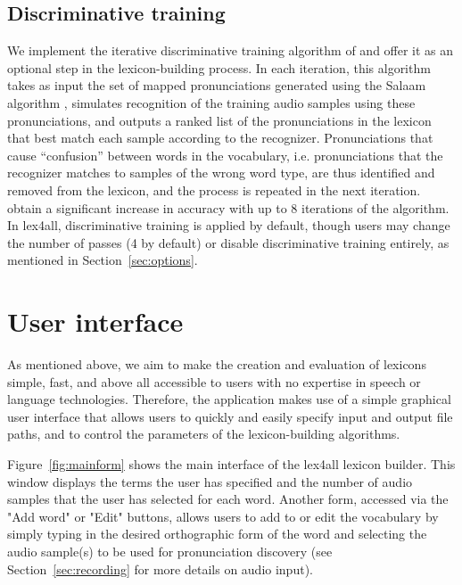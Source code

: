 \documentclass[11pt]{article}
\begin{document}
\subsection{Discriminative training}
\label{sec:discrimtrain}
We implement the iterative discriminative training algorithm of  and offer it as an optional step in the lexicon-building process. 
In each iteration, this algorithm takes as input the set of mapped pronunciations generated using the Salaam algorithm \cite{Qiao10}, simulates recognition of the training audio samples using these pronunciations, and outputs a ranked list of the pronunciations in the lexicon that best match each sample according to the recognizer. 
Pronunciations that cause ``confusion'' between words in the vocabulary, i.e. pronunciations that the recognizer matches to samples of the wrong word type, are thus identified and removed from the lexicon, and the process is repeated in the next iteration. 
 obtain a significant increase in accuracy with up to 8 iterations of the algorithm. 
In lex4all, discriminative training is applied by default, though users may change the number of passes (4 by default) or disable discriminative training entirely, as mentioned in Section~\ref{sec:options}.





\section{User interface}
\label{sec:frontend}

As mentioned above, we aim to make the creation and evaluation of lexicons simple, fast, and above all accessible to users with no expertise in speech or language technologies. Therefore, the application makes use of a simple graphical user interface that allows users to quickly and easily specify input and output file paths, and to control the parameters of the lexicon-building algorithms. 

Figure~\ref{fig:mainform} shows the main interface of the lex4all lexicon builder. This window displays the terms the user has specified and the number of audio samples that the user has selected for each word. Another form, accessed via the "Add word" or "Edit" buttons, allows users to add to or edit the vocabulary by simply typing in the desired orthographic form of the word and selecting the audio sample(s) to be used for pronunciation discovery (see Section~\ref{sec:recording} for more details on audio input).
\end{document}
